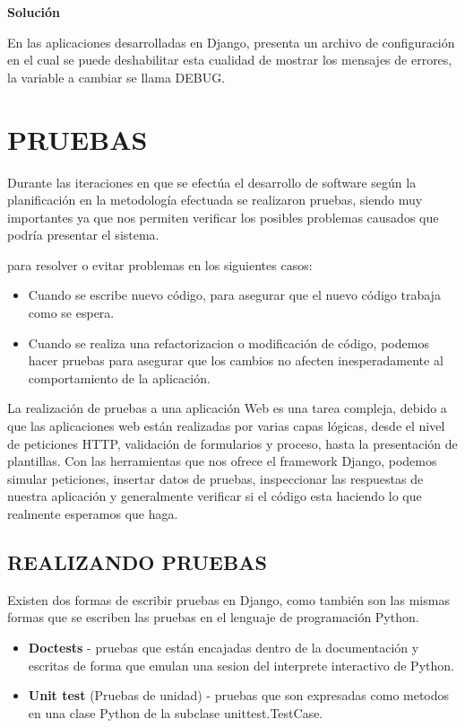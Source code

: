 \textbf{Solución}

En las aplicaciones desarrolladas en Django, presenta un archivo de configuración en el cual se puede deshabilitar esta cualidad de mostrar los mensajes de errores, la variable a cambiar se llama DEBUG.

\section{PRUEBAS}
Durante las iteraciones en que se efectúa el desarrollo de software según la planificación en la metodología efectuada se realizaron pruebas, siendo muy importantes ya que nos permiten verificar los posibles problemas causados que podría presentar el sistema.

para resolver o evitar problemas en los siguientes casos:
\begin{itemize}
 \item Cuando se escribe nuevo código, para asegurar que el nuevo código trabaja como se espera.
 \item Cuando se realiza una refactorizacion o modificación de código, podemos hacer pruebas para asegurar que los cambios no afecten inesperadamente al comportamiento de la aplicación.
\end{itemize}

La realización de pruebas a una aplicación Web es una tarea compleja, debido a que las aplicaciones web están realizadas por varias capas lógicas, desde el nivel de peticiones HTTP, validación de formularios y proceso, hasta la presentación de plantillas. Con las herramientas que nos ofrece el framework Django, podemos simular peticiones, insertar datos de pruebas, inspeccionar las respuestas de nuestra aplicación y generalmente verificar si el código esta haciendo lo que realmente esperamos que haga.

\subsection{REALIZANDO PRUEBAS}
Existen dos formas de escribir pruebas en Django, como también son las mismas formas que se escriben las pruebas en el lenguaje de programación Python.

\begin{itemize}
 \item \textbf{Doctests} - pruebas que están encajadas dentro de la documentación y escritas de forma que emulan una sesion del interprete interactivo de Python.
 \item \textbf{Unit test} (Pruebas de unidad) - pruebas que son expresadas como metodos en una clase Python de la subclase unittest.TestCase.
\end{itemize}


